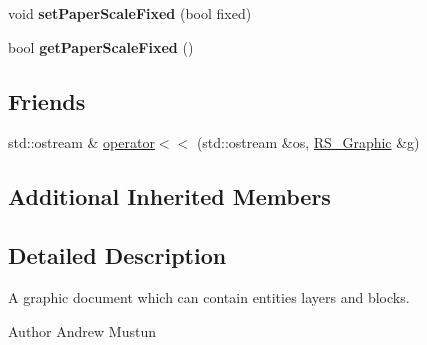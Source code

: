 \begin{DoxyCompactItemize}
\item 
\hypertarget{classRS__Graphic_a4d8699746fd011c687b058092377c292}{void {\bfseries set\-Paper\-Scale\-Fixed} (bool fixed)}\label{classRS__Graphic_a4d8699746fd011c687b058092377c292}

\item 
\hypertarget{classRS__Graphic_a70addac2c919fcaa70b76d6301b40173}{bool {\bfseries get\-Paper\-Scale\-Fixed} ()}\label{classRS__Graphic_a70addac2c919fcaa70b76d6301b40173}

\end{DoxyCompactItemize}
\subsection*{Friends}
\begin{DoxyCompactItemize}
\item 
std\-::ostream \& \hyperlink{classRS__Graphic_ad44f68d4cb86eb6294ee626cc4cdbbe0}{operator$<$$<$} (std\-::ostream \&os, \hyperlink{classRS__Graphic}{R\-S\-\_\-\-Graphic} \&g)
\end{DoxyCompactItemize}
\subsection*{Additional Inherited Members}


\subsection{Detailed Description}
A graphic document which can contain entities layers and blocks.

\begin{DoxyAuthor}{Author}
Andrew Mustun 
\end{DoxyAuthor}



